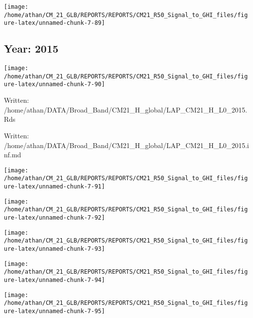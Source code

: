 \documentclass[
  11pt,
  a4paper,oneside]{article}
\begin{document}
\begin{center}\texttt{[image: /home/athan/CM\_21\_GLB/REPORTS/REPORTS/CM21\_R50\_Signal\_to\_GHI\_files/figure-latex/unnamed-chunk-7-89]} \end{center}

\FloatBarrier

\newpage

\hypertarget{year-2015}{%
\subsection{Year: 2015}\label{year-2015}}

\begin{center}\texttt{[image: /home/athan/CM\_21\_GLB/REPORTS/REPORTS/CM21\_R50\_Signal\_to\_GHI\_files/figure-latex/unnamed-chunk-7-90]} \end{center}

Written: /home/athan/DATA/Broad\_Band/CM21\_H\_global/LAP\_CM21\_H\_L0\_2015.Rds

Written: /home/athan/DATA/Broad\_Band/CM21\_H\_global/LAP\_CM21\_H\_L0\_2015.inf.md

\begin{center}\texttt{[image: /home/athan/CM\_21\_GLB/REPORTS/REPORTS/CM21\_R50\_Signal\_to\_GHI\_files/figure-latex/unnamed-chunk-7-91]} \end{center}

\begin{center}\texttt{[image: /home/athan/CM\_21\_GLB/REPORTS/REPORTS/CM21\_R50\_Signal\_to\_GHI\_files/figure-latex/unnamed-chunk-7-92]} \end{center}

\begin{center}\texttt{[image: /home/athan/CM\_21\_GLB/REPORTS/REPORTS/CM21\_R50\_Signal\_to\_GHI\_files/figure-latex/unnamed-chunk-7-93]} \end{center}

\begin{center}\texttt{[image: /home/athan/CM\_21\_GLB/REPORTS/REPORTS/CM21\_R50\_Signal\_to\_GHI\_files/figure-latex/unnamed-chunk-7-94]} \end{center}

\begin{center}\texttt{[image: /home/athan/CM\_21\_GLB/REPORTS/REPORTS/CM21\_R50\_Signal\_to\_GHI\_files/figure-latex/unnamed-chunk-7-95]} \end{center}
\end{document}
